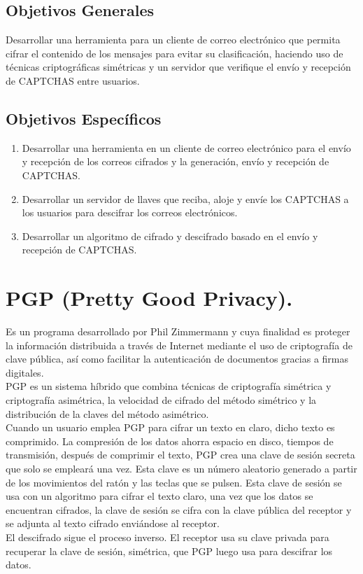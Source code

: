     \subsection{Objetivos Generales} %
    
    
      Desarrollar  una  herramienta  para  un  cliente  de  correo  electrónico  que  permita  cifrar  el 
      contenido  de  los  mensajes  para  evitar  su  clasificación, haciendo uso de técnicas criptográficas simétricas y un servidor que verifique el envío y recepción de CAPTCHAS entre usuarios. 
    \subsection{Objetivos Específicos} %
    
    
        \begin{enumerate}
         \item Desarrollar  una  herramienta  en  un  cliente  de  correo  electrónico  para  el  envío  y recepción  de   los   correos  cifrados   y   la  generación,  envío  y  recepción  de CAPTCHAS. 
         \item Desarrollar un servidor de llaves que reciba, aloje y envíe los CAPTCHAS a los usuarios para descifrar los correos electrónicos.       
         \item Desarrollar un algoritmo de cifrado y descifrado basado en el envío y recepción de CAPTCHAS.
        \end{enumerate}

\section{PGP (Pretty Good Privacy).}
Es un programa desarrollado por Phil Zimmermann y cuya finalidad es proteger la información distribuida a través de Internet mediante el uso de criptografía de clave pública, así como facilitar la autenticación de documentos gracias a firmas digitales.\\
PGP es un sistema híbrido que combina técnicas de criptografía simétrica y criptografía asimétrica, la velocidad de cifrado del método simétrico y la distribución de la claves del método asimétrico.\\
Cuando un usuario emplea PGP para cifrar un texto en claro, dicho texto es comprimido. La compresión de los datos ahorra espacio en disco, tiempos de transmisión, después de comprimir el texto, PGP crea una clave de sesión secreta que solo se empleará una vez. Esta clave es un número aleatorio generado a partir de los movimientos del ratón y las teclas que se pulsen. Esta clave de sesión se usa con un algoritmo para cifrar el texto claro, una vez que los datos se encuentran cifrados, la clave de sesión se cifra con la clave pública del receptor y se adjunta al texto cifrado enviándose al receptor.\\
El descifrado sigue el proceso inverso. El receptor usa su clave privada para recuperar la clave de sesión, simétrica, que PGP luego usa para descifrar los datos.\cite{pgp}\\
